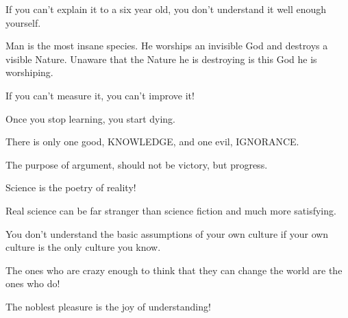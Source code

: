 \documentclass[12pt,a4paper,twoside,openright]{report}
\theoremstyle{definition}
\theoremstyle{itexmp}
\numberwithin{equation}{section}
\begin{document}
 	\begin{fquote}If you can't explain it to a six year old, you don't understand it well enough yourself.
 	\end{fquote}
 	
 	\begin{fquote}Man is the most insane species. He worships an invisible God and destroys a visible Nature. Unaware that the Nature he is destroying is this God he is worshiping.
 	\end{fquote}
 	
 	\begin{fquote}If you can't measure it, you can't improve it!
 	\end{fquote}
 	
 	\begin{fquote}Once you stop learning, you start dying.
 	\end{fquote}
 	
 	\begin{fquote}[Socrates]There is only one good, KNOWLEDGE, and one evil, IGNORANCE.
 	\end{fquote}
 	
 	\begin{fquote}[?]The purpose of argument, should not be victory, but progress.
 	\end{fquote}
 	
 	\begin{fquote}Science is the poetry of reality!
 	\end{fquote}
 	
 	\begin{fquote}Real science can be far stranger than science fiction and much more satisfying.
 	\end{fquote}
 	
 	\begin{fquote} You don't understand the basic assumptions of your own culture if your own culture is the only culture you know.
 	\end{fquote}
 	
 	\begin{fquote}The ones who are crazy enough to think that they can change the world are the ones who do!
 	\end{fquote}
 	
 	\begin{fquote}The noblest pleasure is the joy of understanding!
 	\end{fquote}
 	
\end{document}
